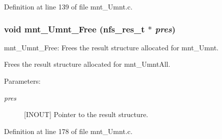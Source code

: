 Definition at line 139 of file mnt\_\-Umnt.c.
\subsubsection[{mnt\_\-Umnt\_\-Free}]{\setlength{\rightskip}{0pt plus 5cm}void mnt\_\-Umnt\_\-Free (nfs\_\-res\_\-t $\ast$ {\em pres})}\label{mnt__Umnt_8c_0aed32a96096e0a88bccd4698f103a9f}


mnt\_\-Umnt\_\-Free: Frees the result structure allocated for mnt\_\-Umnt.

Frees the result structure allocated for mnt\_\-UmntAll.

\begin{Desc}
\item[Parameters:]
\begin{description}
\item[{\em pres}][INOUT] Pointer to the result structure. \end{description}
\end{Desc}


Definition at line 178 of file mnt\_\-Umnt.c.